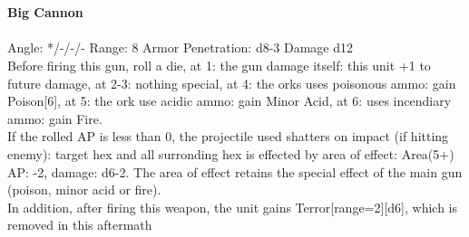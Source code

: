 \ \\
\ \\
{\bf Big Cannon } \\
\ \\
Angle: */-/-/- Range: 8 Armor Penetration: d8-3 Damage d12 \\
\indent Before firing this gun, roll a die, at 1: the gun damage itself: this unit +1 to future damage, at 2-3: nothing special, at 4: the orks uses poisonous ammo: gain Poison[6], at 5: the ork use acidic ammo: gain Minor Acid, at 6: uses incendiary ammo: gain Fire. \\ If the rolled AP is less than 0, the projectile used shatters on impact (if hitting enemy): target hex and all surronding hex is effected by area of effect: Area(5+) AP: -2, damage: d6-2. The area of effect retains the special effect of the main gun (poison, minor acid or fire).\\ In addition, after firing this weapon, the unit gains Terror[range=2][d6], which is removed in this aftermath \\





